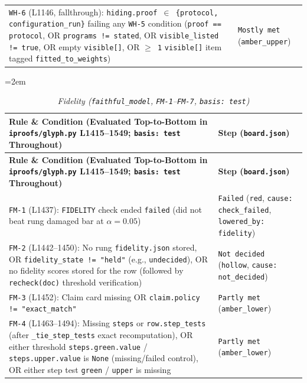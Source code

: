 \documentclass[11pt,letterpaper]{article}
\begin{document}
{\begin{longtable}{@{}>{\raggedright\arraybackslash}p{} >{\raggedright\arraybackslash}p{}@{}}
\texttt{WH-6} (L1146, fallthrough): \texttt{hiding.\allowbreak{}proof $\in$ \{protocol, configuration\_\allowbreak{}run\}} failing any \texttt{WH-5} condition (\texttt{proof == protocol}, OR \texttt{programs != stated}, OR \texttt{visible\_\allowbreak{}listed != true}, OR empty \texttt{visible[]}, OR \texttt{$\ge$ 1} \texttt{visible[]} item tagged \texttt{fitted\_\allowbreak{}to\_\allowbreak{}weights}) & \texttt{Mostly met} (\texttt{amber\_\allowbreak{}upper}) \\
\end{longtable}
}

{\footnotesize\setlength{\tabcolsep}{4pt}\emergencystretch=2em
\begin{longtable}{@{}>{\raggedright\arraybackslash}p{} >{\raggedright\arraybackslash}p{}@{}}
\caption{\textit{Fidelity (\texttt{faithful\_\allowbreak{}model}, \texttt{FM-1}--\texttt{FM-7}, \texttt{basis: test})}} \\
\toprule
\textbf{Rule \& Condition (Evaluated Top-to-Bottom in \texttt{iproofs/\allowbreak{}glyph.\allowbreak{}py} L1415--1549; \texttt{basis: test} Throughout)} & \textbf{Step (\texttt{board.\allowbreak{}json})} \\
\midrule
\endfirsthead
\toprule
\textbf{Rule \& Condition (Evaluated Top-to-Bottom in \texttt{iproofs/\allowbreak{}glyph.\allowbreak{}py} L1415--1549; \texttt{basis: test} Throughout)} & \textbf{Step (\texttt{board.\allowbreak{}json})} \\
\midrule
\endhead
\bottomrule
\endfoot
\texttt{FM-1} (L1437): \texttt{FIDELITY} check ended \texttt{failed} (did not beat rung damaged bar at $\alpha = 0.05$) & \texttt{Failed} (\texttt{red}, \texttt{cause: check\_\allowbreak{}failed}, \texttt{lowered\_\allowbreak{}by: fidelity}) \\
\texttt{FM-2} (L1442--1450): No rung \texttt{fidelity.\allowbreak{}json} stored, OR \texttt{fidelity\_\allowbreak{}state != "held"} (e.g., \texttt{undecided}), OR no fidelity scores stored for the row (followed by \texttt{recheck(doc)} threshold verification) & \texttt{Not decided} (\texttt{hollow}, \texttt{cause: not\_\allowbreak{}decided}) \\
\texttt{FM-3} (L1452): Claim card missing OR \texttt{claim.\allowbreak{}policy != "exact\_\allowbreak{}match"} & \texttt{Partly met} (\texttt{amber\_\allowbreak{}lower}) \\
\texttt{FM-4} (L1463--1494): Missing \texttt{steps} or \texttt{row.\allowbreak{}step\_\allowbreak{}tests} (after \texttt{\_\allowbreak{}tie\_\allowbreak{}step\_\allowbreak{}tests} exact recomputation), OR either threshold \texttt{steps.\allowbreak{}green.\allowbreak{}value} / \texttt{steps.\allowbreak{}upper.\allowbreak{}value} is \texttt{None} (missing/failed control), OR either step test \texttt{green} / \texttt{upper} is missing & \texttt{Partly met} (\texttt{amber\_\allowbreak{}lower}) \\

\end{longtable}}
\end{document}
